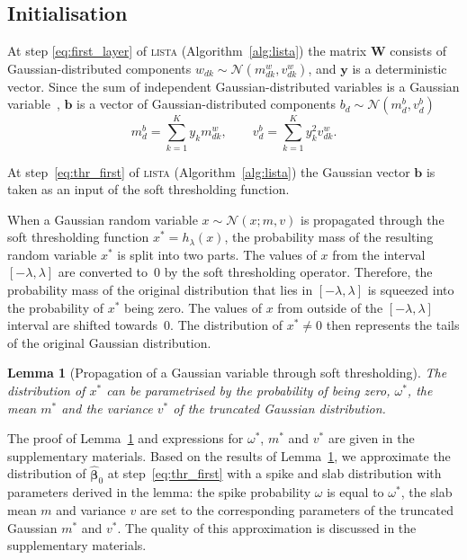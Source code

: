 \documentclass{article}
\newtheorem{lemma}{Lemma}
\begin{document}
  \subsection{Initialisation}
  At step \ref{eq:first_layer} of \textsc{lista} (Algorithm~\ref{alg:lista}) the matrix $\mathbf{W}$ consists of Gaussian-distributed components $w_{dk} \sim \mathcal{N}(m^w_{dk}, v^w_{dk})$, and $\mathbf{y}$ is a deterministic vector. Since the sum of independent Gaussian-distributed variables is a Gaussian variable~\cite{eisenberg2008sum}, $\mathbf{b}$ is a vector of Gaussian-distributed components $b_d \sim \mathcal{N}(m^b_d, v^b_d)$
  \begin{equation}
  \label{eq:matrix_vector_product}
  m^b_d = \sum_{k=1}^Ky_k m^w_{dk}, \qquad
  v^b_d = \sum_{k=1}^Ky_k^2v^w_{dk}.
  \end{equation}
  
  At step~\ref{eq:thr_first} of \textsc{lista} (Algorithm~\ref{alg:lista}) the Gaussian vector $\mathbf{b}$ is taken as an input of the soft thresholding function.
  
  When a Gaussian random variable $x \sim \mathcal{N}(x; m, v)$ is propagated through the soft thresholding function $x^* = h_{\lambda}(x)$, the probability mass of the resulting random variable $x^*$ is split into two parts. The values of $x$ from the interval $[-\lambda, \lambda]$ are converted to~$0$ by the soft thresholding operator. Therefore, the probability mass of the original distribution that lies in $[-\lambda, \lambda]$ is squeezed into the probability of $x^*$ being zero. The values of $x$ from outside of the $[-\lambda, \lambda]$ interval are shifted towards~$0$. The distribution of $x^* \neq 0$ then represents the tails of the original Gaussian distribution.
  
  \begin{lemma}[Propagation of a Gaussian variable through soft thresholding]
  \label{thm:soft_thresholding}
  The distribution of $x^*$ can be parametrised by the probability of being zero, $\omega^*$, the mean $m^*$ and the variance $v^*$ of the truncated Gaussian distribution.
  \end{lemma}
  
  The proof of Lemma~\ref{thm:soft_thresholding} and expressions for $\omega^*$, $m^*$ and $v^*$ are given in the supplementary materials. Based on the results of Lemma~\ref{thm:soft_thresholding}, we approximate the distribution of $\widehat{\boldsymbol\beta}_0$ at step~\ref{eq:thr_first} with a spike and slab distribution with parameters derived in the lemma: the spike probability $\omega$ is equal to $\omega^*$, the slab mean $m$ and variance $v$ are set to the corresponding parameters of the truncated Gaussian $m^*$ and $v^*$. The quality of this approximation is discussed in the supplementary materials.
  
\end{document}
